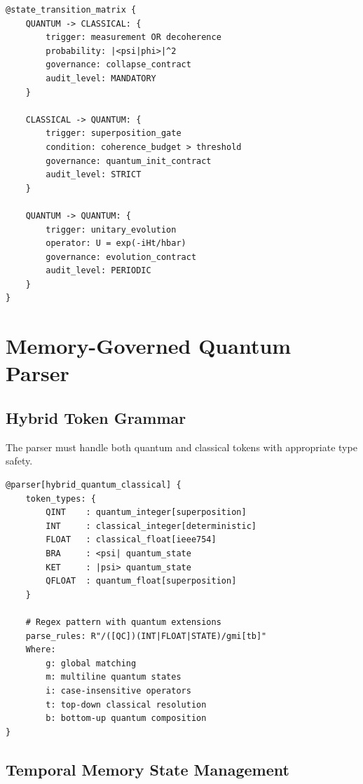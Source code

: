 \documentclass[12pt,a4paper]{article}
\begin{document}
\begin{lstlisting}[style=riftlang,caption={Quantum-Classical State Transitions}]
@state_transition_matrix {
    QUANTUM -> CLASSICAL: {
        trigger: measurement OR decoherence
        probability: |<psi|phi>|^2
        governance: collapse_contract
        audit_level: MANDATORY
    }
    
    CLASSICAL -> QUANTUM: {
        trigger: superposition_gate
        condition: coherence_budget > threshold
        governance: quantum_init_contract
        audit_level: STRICT
    }
    
    QUANTUM -> QUANTUM: {
        trigger: unitary_evolution
        operator: U = exp(-iHt/hbar)
        governance: evolution_contract
        audit_level: PERIODIC
    }
}
\end{lstlisting}

\section{Memory-Governed Quantum Parser}

\subsection{Hybrid Token Grammar}

The parser must handle both quantum and classical tokens with appropriate type safety.

\begin{lstlisting}[style=riftlang,caption={Token Type Definitions}]
@parser[hybrid_quantum_classical] {
    token_types: {
        QINT    : quantum_integer[superposition]
        INT     : classical_integer[deterministic]
        FLOAT   : classical_float[ieee754]
        BRA     : <psi| quantum_state
        KET     : |psi> quantum_state
        QFLOAT  : quantum_float[superposition]
    }
    
    # Regex pattern with quantum extensions
    parse_rules: R"/([QC])(INT|FLOAT|STATE)/gmi[tb]"
    Where:
        g: global matching
        m: multiline quantum states
        i: case-insensitive operators
        t: top-down classical resolution
        b: bottom-up quantum composition
}
\end{lstlisting}

\subsection{Temporal Memory State Management}
\end{document}
